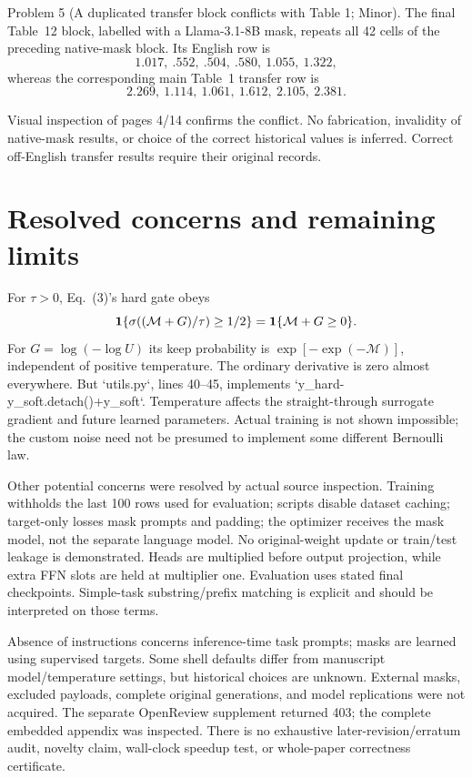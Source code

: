 \documentclass[10pt]{article}
\begin{document}
Problem 5 (A duplicated transfer block conflicts with Table 1; Minor).  The final Table 12 block, labelled with a Llama-3.1-8B mask, repeats all 42 cells of the preceding native-mask block. Its English row is \[1.017,\ .552,\ .504,\ .580,\ 1.055,\ 1.322,\] whereas the corresponding main Table 1 transfer row is \[2.269,\ 1.114,\ 1.061,\ 1.612,\ 2.105,\ 2.381.\]\par
Visual inspection of pages 4/14 confirms the conflict. No fabrication, invalidity of native-mask results, or choice of the correct historical values is inferred. Correct off-English transfer results require their original records.\par
\section*{Resolved concerns and remaining limits}
For \(\tau>0\), Eq. (3)’s hard gate obeys \[{\bf1}\{\sigma((\mathcal M+G)/\tau)\geq1/2\}
 ={\bf1}\{\mathcal M+G\geq0\}.\] For \(G=\log(-\log U)\) its keep probability is \(\exp[-\exp(-\mathcal M)]\), independent of positive temperature. The ordinary derivative is zero almost everywhere. But `utils.py`, lines 40–45, implements `y\_hard-y\_soft.detach()+y\_soft`. Temperature affects the straight-through surrogate gradient and future learned parameters. Actual training is not shown impossible; the custom noise need not be presumed to implement some different Bernoulli law.\par
Other potential concerns were resolved by actual source inspection. Training withholds the last 100 rows used for evaluation; scripts disable dataset caching; target-only losses mask prompts and padding; the optimizer receives the mask model, not the separate language model. No original-weight update or train/test leakage is demonstrated. Heads are multiplied before output projection, while extra FFN slots are held at multiplier one. Evaluation uses stated final checkpoints. Simple-task substring/prefix matching is explicit and should be interpreted on those terms.\par
Absence of instructions concerns inference-time task prompts; masks are learned using supervised targets. Some shell defaults differ from manuscript model/temperature settings, but historical choices are unknown. External masks, excluded payloads, complete original generations, and model replications were not acquired. The separate OpenReview supplement returned 403; the complete embedded appendix was inspected. There is no exhaustive later-revision/erratum audit, novelty claim, wall-clock speedup test, or whole-paper correctness certificate.\par
\end{document}
